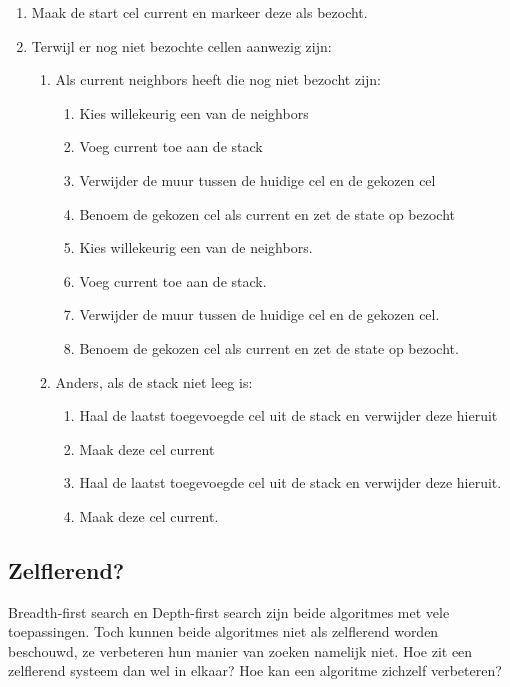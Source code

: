 \begin{enumerate}
\item Maak de start cel current en markeer deze als bezocht.
\item Terwijl er nog niet bezochte cellen aanwezig zijn:
	\begin{enumerate}
	\item Als current neighbors heeft die nog niet bezocht zijn:
		\begin{enumerate}
		\item Kies willekeurig een van de neighbors
		\item Voeg current toe aan de stack
		\item Verwijder de muur tussen de huidige cel en de gekozen cel
		\item Benoem de gekozen cel als current en zet de state op bezocht
		\item Kies willekeurig een van de neighbors.
		\item Voeg current toe aan de stack.
		\item Verwijder de muur tussen de huidige cel en de gekozen cel.
		\item Benoem de gekozen cel als current en zet de state op bezocht.
		\end{enumerate}			
	
	\item Anders, als de stack niet leeg is:
		\begin{enumerate}
		\item Haal de laatst toegevoegde cel uit de stack en verwijder deze hieruit
		\item Maak deze cel current
		\item Haal de laatst toegevoegde cel uit de stack en verwijder deze hieruit.
		\item Maak deze cel current.
		\end{enumerate}	
	\end{enumerate}
\end{enumerate}
\subsection{Zelflerend?}
Breadth-first search en Depth-first search zijn beide algoritmes met vele toepassingen. Toch kunnen beide algoritmes niet als zelflerend worden beschouwd, ze verbeteren hun manier van zoeken namelijk niet. Hoe zit een zelflerend systeem dan wel in elkaar? Hoe kan een algoritme zichzelf verbeteren?



